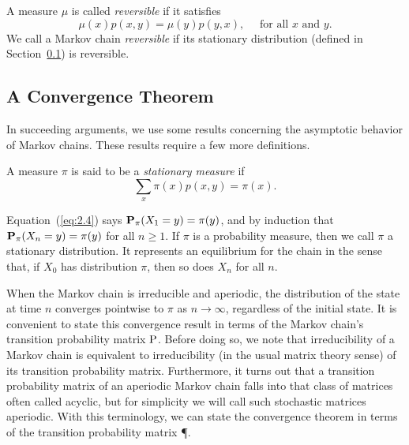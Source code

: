 \begin{definition}
\label{def:2.1.3}
A measure $\mu$ is called \emph{reversible} if it satisfies
\[
\mu(x)p(x,y) = \mu(y)p(y,x), \quad  \text{ for all $x$ and $y$.}
\]
We call a Markov chain \emph{reversible} if its stationary distribution (defined
in Section~\ref{sec:convergence-theorem}) is reversible. 
\end{definition}




\subsection{A Convergence Theorem}
\label{sec:convergence-theorem}
In succeeding arguments, we use some results concerning the asymptotic behavior of
Markov chains. These results require a few more definitions.

\begin{definition}
\label{def:2.1.4}
A measure $\pi$ is said to be a \emph{stationary measure} if
\begin{equation}
  \label{eq:2.4}
\sum_x \pi(x) p(x,y) = \pi(x).
\end{equation}
\end{definition}

Equation~(\ref{eq:2.4}) says $\bP_\pi(X_1 = y) = \pi(y)$, 
and by induction that $\bP_\pi(X_n = y) = \pi(y)$ for all $n \geq 1$. 
If $\pi$ is a probability measure, then we call $\pi$ a stationary distribution. It
represents an equilibrium for the chain in the sense that, if $X_0$ has
distribution $\pi$, then so does $X_n$ for all $n$.

When the Markov chain is irreducible and aperiodic, the distribution of the state at time
$n$ converges pointwise to $\pi$ as $n \rightarrow \infty$, regardless of the
initial state. It is convenient to state this convergence result in terms of the
Markov chain's transition probability matrix $\P$. Before doing so, we note that
irreducibility of a Markov chain is equivalent to irreducibility (in the usual 
matrix theory sense) of its transition probability matrix. Furthermore, it turns
out that a transition probability matrix of an aperiodic Markov chain falls into
that class of matrices often called acyclic, but for simplicity we will call
such stochastic matrices aperiodic. With this terminology, we can state the
convergence theorem in terms of the transition probability matrix \P. 

